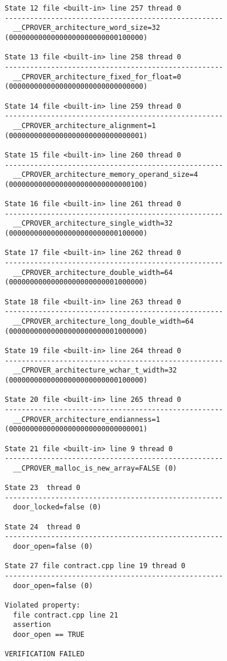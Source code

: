 \begin{lstlisting}
State 12 file <built-in> line 257 thread 0
----------------------------------------------------
  __CPROVER_architecture_word_size=32 (00000000000000000000000000100000)

State 13 file <built-in> line 258 thread 0
----------------------------------------------------
  __CPROVER_architecture_fixed_for_float=0 (00000000000000000000000000000000)

State 14 file <built-in> line 259 thread 0
----------------------------------------------------
  __CPROVER_architecture_alignment=1 (00000000000000000000000000000001)

State 15 file <built-in> line 260 thread 0
----------------------------------------------------
  __CPROVER_architecture_memory_operand_size=4 (00000000000000000000000000000100)

State 16 file <built-in> line 261 thread 0
----------------------------------------------------
  __CPROVER_architecture_single_width=32 (00000000000000000000000000100000)

State 17 file <built-in> line 262 thread 0
----------------------------------------------------
  __CPROVER_architecture_double_width=64 (00000000000000000000000001000000)

State 18 file <built-in> line 263 thread 0
----------------------------------------------------
  __CPROVER_architecture_long_double_width=64 (00000000000000000000000001000000)

State 19 file <built-in> line 264 thread 0
----------------------------------------------------
  __CPROVER_architecture_wchar_t_width=32 (00000000000000000000000000100000)

State 20 file <built-in> line 265 thread 0
----------------------------------------------------
  __CPROVER_architecture_endianness=1 (00000000000000000000000000000001)

State 21 file <built-in> line 9 thread 0
----------------------------------------------------
  __CPROVER_malloc_is_new_array=FALSE (0)

State 23  thread 0
----------------------------------------------------
  door_locked=false (0)

State 24  thread 0
----------------------------------------------------
  door_open=false (0)

State 27 file contract.cpp line 19 thread 0
----------------------------------------------------
  door_open=false (0)

Violated property:
  file contract.cpp line 21
  assertion
  door_open == TRUE

VERIFICATION FAILED

\end{lstlisting}




